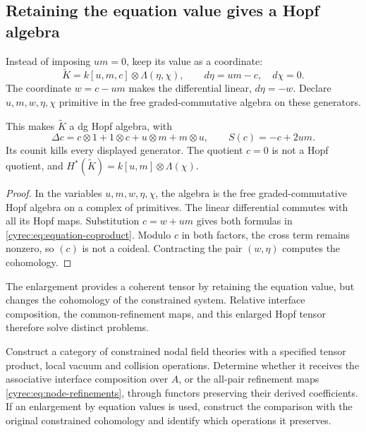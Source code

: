 \subsection{Retaining the equation value gives a Hopf algebra}

Instead of imposing $um=0$, keep its value as a coordinate:
\[
 \widetilde K=k[u,m,c]\otimes\Lambda(\eta,\chi),
 \qquad d\eta=um-c,\quad d\chi=0.
\]
The coordinate $w=c-um$ makes the differential linear,
$d\eta=-w$.
Declare $u,m,w,\eta,\chi$ primitive in the free
graded-commutative algebra on these generators.

\begin{proposition}\label{cyrec:prop:equation-hopf}
This makes $\widetilde K$ a dg Hopf algebra, with
\begin{equation}\label{cyrec:eq:equation-coproduct}
 \Delta c=c\otimes1+1\otimes c+u\otimes m+m\otimes u,
 \qquad S(c)=-c+2um.
\end{equation}
Its counit kills every displayed generator. The quotient $c=0$
is not a Hopf quotient, and
$H^*(\widetilde K)=k[u,m]\otimes\Lambda(\chi)$.
\end{proposition}

\begin{proof}
In the variables $u,m,w,\eta,\chi$, the algebra is the free
graded-commutative Hopf algebra on a complex of primitives.
The linear differential commutes with all its Hopf maps.
Substitution $c=w+um$ gives both formulas in
\eqref{cyrec:eq:equation-coproduct}.
Modulo $c$ in both factors, the cross term remains nonzero,
so $(c)$ is not a coideal. Contracting the pair $(w,\eta)$
computes the cohomology.
\end{proof}

The enlargement provides a coherent tensor by retaining the
equation value, but changes the cohomology of the constrained
system. Relative interface composition, the common-refinement
maps, and this enlarged Hopf tensor therefore solve distinct
problems.

\begin{problem}\label{cyrec:prob:constrained-fusion}
Construct a category of constrained nodal field theories with a
specified tensor product, local vacuum and collision operations.
Determine whether it receives the associative interface
composition over $A$, or the all-pair refinement maps
\eqref{cyrec:eq:node-refinements}, through functors preserving
their derived coefficients. If an enlargement by equation values
is used, construct the comparison with the original constrained
cohomology and identify which operations it preserves.
\end{problem}
